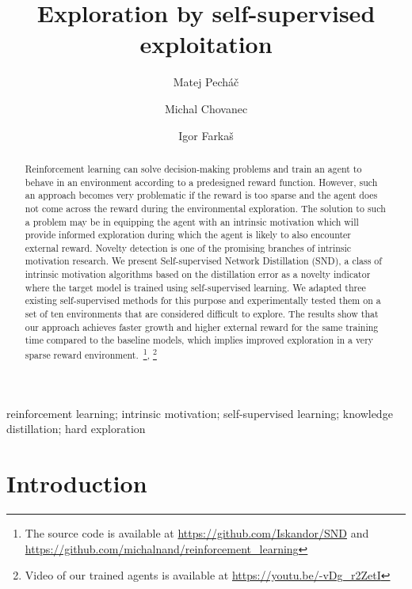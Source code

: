 \documentclass[a4paper,11pt]{elsarticle}
\begin{document}
\begin{frontmatter}
\date{}

\title{Exploration by self-supervised exploitation}

\author[1,*]{Matej Pech\'a\v{c}}
\author[2]{Michal Chovanec}
\author[1]{Igor Farka\v{s}}

\address[1]{Department of Applied Informatics, Comenius University Bratislava, Slovak Republic}
\address[2]{Photoneo, Ltd., Bratislava, Slovak Republic}
\address[*]{Correspondence: matej.pechac@fmph.uniba.sk}




\begin{abstract}
Reinforcement learning can solve decision-making problems and train an agent to behave in an environment according to a predesigned reward function. However, such an approach becomes very problematic if the reward is too sparse and the agent does not come across the reward during the environmental exploration. The solution to such a problem may be in equipping the agent with an intrinsic motivation which will provide informed exploration during which the agent is likely to also encounter external reward. Novelty detection is one of the promising branches of intrinsic motivation research. We present Self-supervised Network Distillation (SND), a class of intrinsic motivation algorithms based on the distillation error as a novelty indicator where the target model is trained using self-supervised learning. We adapted three existing self-supervised methods for this purpose and experimentally tested them on a set of ten environments that are considered difficult to explore. The results show that our approach achieves faster growth and higher external reward for the same training time compared to the baseline models, which implies improved exploration in a very sparse reward environment.~\footnote{The source code is available at \url{https://github.com/Iskandor/SND} and \url{https://github.com/michalnand/reinforcement_learning}},
\footnote{Video of our trained agents is available at \url{https://youtu.be/-vDg_r2ZetI}}
\end{abstract}

\begin{keyword}
reinforcement learning; intrinsic motivation; self-supervised learning; knowledge distillation; hard exploration
\end{keyword}
\end{frontmatter}

\section{Introduction}
\label{sec:intro}
\end{document}
